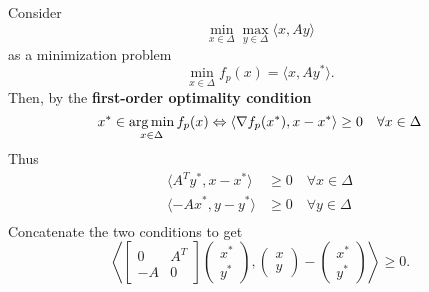 \documentclass{beamer}
\begin{document}
\begin{frame}
  \frametitle{}
  Consider
  \begin{equation}
      \min_{x \in \Delta} \max_{y \in \Delta} \langle x, Ay \rangle
  \end{equation}
  as a minimization problem
  \begin{equation}
      \min_{x \in \Delta}  f_p(x) = \langle x, A y^* \rangle .
  \end{equation}
  Then, by the \textbf{first-order optimality condition}
  \begin{equation}
    x^* \in \operatorname*{arg\,min}_{x \in \Delta} f_p(x)  \Leftrightarrow \langle \nabla f_p(x^*), x-x^* \rangle \ge 0 \quad \forall x \in \Delta
  \end{equation}
  Thus
  \begin{equation}
    \begin{aligned}
      \langle A^T y^*, x-x^* \rangle &\ge 0 \quad \forall  x \in \Delta \\
      \langle -A x^*, y-y^* \rangle &\ge 0 \quad \forall  y \in \Delta \\
    \end{aligned}
  \end{equation}
  Concatenate the two conditions to get
  \begin{equation}
  \left\langle \begin{bmatrix}
      0 & A^T \\
      -A & 0
    \end{bmatrix}
    \left(\begin{array}{c}
      x^*\\ y^*
    \end{array}  \right),
    \left(\begin{array}{c}
      x \\ y
    \end{array}  \right)
    -
    \left(\begin{array}{c}
      x^* \\
      y^*
    \end{array} \right)
 \right\rangle \ge 0.
  \end{equation}
\end{frame}
\end{document}
